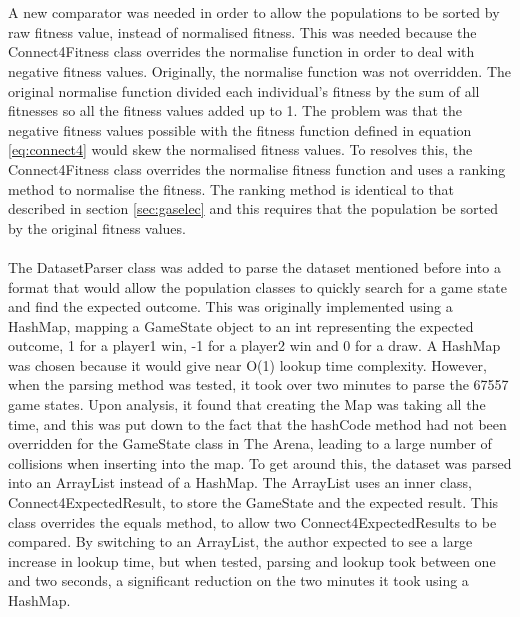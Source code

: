 \\\\A new comparator was needed in order to allow the populations to be sorted by raw fitness value, instead of normalised fitness. This was needed because the Connect4Fitness class overrides the normalise function in order to deal with negative fitness values. Originally, the normalise function was not overridden. The original normalise function divided each individual's fitness by the sum of all fitnesses so all the fitness values added up to 1. The problem was that the negative fitness values possible with the fitness function defined in equation \ref{eq:connect4} would skew the normalised fitness values. To resolves this, the Connect4Fitness class overrides the normalise fitness function and uses a ranking method to normalise the fitness. The ranking method is identical to that described in section \ref{sec:gaselec} and this requires that the population be sorted by the original fitness values.
\\\\The DatasetParser class was added to parse the dataset mentioned before into a format that would allow the population classes to quickly search for a game state and find the expected outcome. This was originally implemented using a HashMap, mapping a GameState object to an int representing the expected outcome, 1 for a player1 win, -1 for a player2 win and 0 for a draw. A HashMap was chosen because it would give near O(1) lookup time complexity. However, when the parsing method was tested, it took over two minutes to parse the 67557 game states. Upon analysis, it found that creating the Map was taking all the time, and this was put down to the fact that the hashCode method had not been overridden for the GameState class in The Arena, leading to a large number of collisions when inserting into the map. To get around this, the dataset was parsed into an ArrayList instead of a HashMap. The ArrayList uses an inner class, Connect4ExpectedResult, to store the GameState and the expected result. This class overrides the equals method, to allow two Connect4ExpectedResults to be compared. By switching to an ArrayList, the author expected to see a large increase in lookup time, but when tested, parsing and lookup took between one and two seconds, a significant reduction on the two minutes it took using a HashMap.

